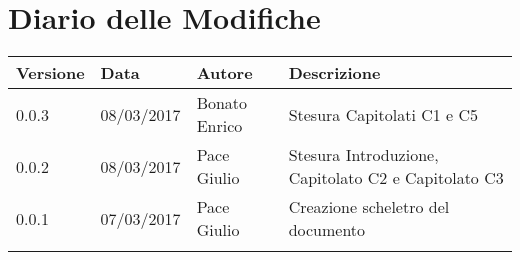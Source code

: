 \section*{Diario delle Modifiche}
\begin{longtabu} to \textwidth {
	X[4,l,p]
	X[4,l,p]
	X[4,l,p]
	X[8,l,p]}
	\toprule
		 Versione & Data & Autore & Descrizione \\
		\midrule
		\endhead
		0.0.3 & 08/03/2017 & Bonato Enrico & Stesura Capitolati C1 e C5\\
		0.0.2 & 08/03/2017 & Pace Giulio & Stesura Introduzione, Capitolato C2 e Capitolato C3\\
		0.0.1 & 07/03/2017 & Pace Giulio & Creazione scheletro del documento\\
		\addlinespace[0.4em]
		
	\bottomrule
\end{longtabu}